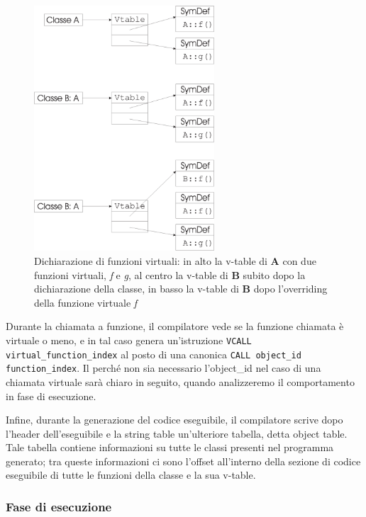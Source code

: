 \documentclass[a4paper, 11pt]{article}
\newcommand{\code}[1]{\scriptsize{\texttt{#1}}\normalsize}
\begin{document}
\begin{figure}[ht]
\centering
\includegraphics[width=0.6\textwidth]{virtual.eps}
\caption{Dichiarazione di funzioni virtuali: in alto la v-table di \textbf{A} con due funzioni virtuali, \emph{f} e \emph{g}, al centro la v-table di \textbf{B} subito dopo la dichiarazione della classe, in basso la v-table di \textbf{B} dopo l'overriding della funzione virtuale \emph{f}}
\label{fig:virtual}
\end{figure}

Durante la chiamata a funzione, il compilatore vede se la funzione chiamata \`e virtuale o meno, e in tal caso genera un'istruzione \code{VCALL virtual\_function\_index} al posto di una canonica \code{CALL object\_id function\_index}. Il perch\'e non sia necessario l'object\_id nel caso di una chiamata virtuale sar\`a chiaro in seguito, quando analizzeremo il comportamento in fase di esecuzione.

Infine, durante la generazione del codice eseguibile, il compilatore scrive dopo l'header dell'eseguibile e la string table un'ulteriore tabella, detta object table. Tale tabella contiene informazioni su tutte le classi presenti nel programma generato; tra queste informazioni ci sono l'offset all'interno della sezione di codice eseguibile di tutte le funzioni della classe e la sua v-table.

\subsubsection{Fase di esecuzione}
\end{document}
